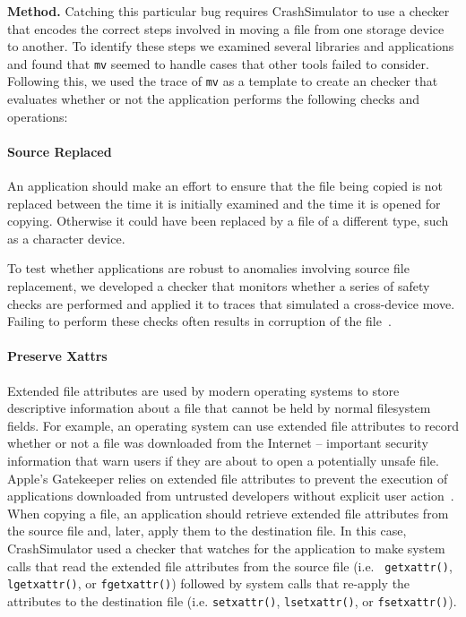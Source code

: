 {\bf Method.}  Catching this particular bug requires CrashSimulator to use
a checker that encodes the correct steps involved in moving a file from one
storage device to another. To identify these steps
we examined several libraries and applications and found that {\tt mv} seemed
to handle cases that other tools failed to consider.  Following this, we
used the trace of {\tt mv} as a template to create an checker that
evaluates whether or not the application performs the following
checks and operations:

\paragraph{Source Replaced}

An application should make an effort to ensure that the file being copied is not
replaced between the time it is initially examined and the time it is opened
for copying.  Otherwise it could have been replaced by a file of a different
type, such as a character device.

To test whether applications are robust to anomalies involving source file replacement,
we developed a checker that monitors whether a series of safety checks
are performed and applied it to traces that simulated a cross-device move.
Failing to perform these checks often results in corruption of the file~\cite{PythonShutilBug}.

\paragraph{Preserve Xattrs}

Extended file attributes are used by modern
operating systems to store descriptive information about a file that cannot be
held by normal filesystem fields.  For example, an operating system can use
extended file attributes to record whether or not a file was downloaded from the
Internet -- important security information that warn
users if they are about to open a potentially unsafe file.  Apple's Gatekeeper
relies on extended file attributes to prevent the execution of applications downloaded from
untrusted developers without explicit user action~\cite{AppleCodeSigning}.
When copying a file,
an application should retrieve extended file attributes from the source
file and, later, apply them to the destination file.
In this case, CrashSimulator used a checker
that watches for the application to make system calls
that read the extended file attributes from the source file (i.e. {\tt
  getxattr()}, {\tt lgetxattr()}, or {\tt fgetxattr()}) followed by system calls
that re-apply the attributes to the destination file (i.e. {\tt setxattr()},
{\tt lsetxattr()}, or {\tt fsetxattr()}).

